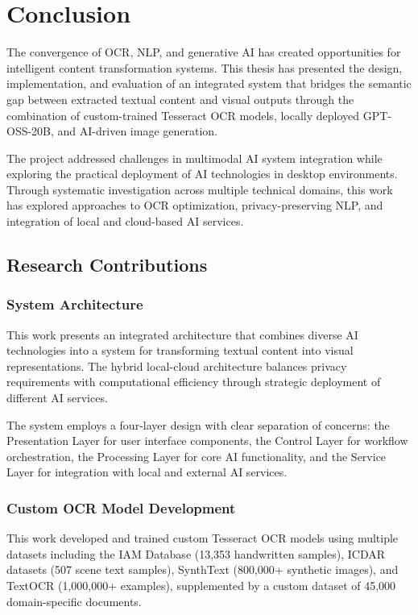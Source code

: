 \chapter{Conclusion}

The convergence of OCR, NLP, and generative AI has created opportunities for intelligent content transformation systems. This thesis has presented the design, implementation, and evaluation of an integrated system that bridges the semantic gap between extracted textual content and visual outputs through the combination of custom-trained Tesseract OCR models, locally deployed GPT-OSS-20B, and AI-driven image generation.

The project addressed challenges in multimodal AI system integration while exploring the practical deployment of AI technologies in desktop environments. Through systematic investigation across multiple technical domains, this work has explored approaches to OCR optimization, privacy-preserving NLP, and integration of local and cloud-based AI services.

\section{Research Contributions}

\subsection{System Architecture}

This work presents an integrated architecture that combines diverse AI technologies into a system for transforming textual content into visual representations. The hybrid local-cloud architecture balances privacy requirements with computational efficiency through strategic deployment of different AI services.

The system employs a four-layer design with clear separation of concerns: the Presentation Layer for user interface components, the Control Layer for workflow orchestration, the Processing Layer for core AI functionality, and the Service Layer for integration with local and external AI services.

\subsection{Custom OCR Model Development}

This work developed and trained custom Tesseract OCR models using multiple datasets including the IAM Database (13,353 handwritten samples), ICDAR datasets (507 scene text samples), SynthText (800,000+ synthetic images), and TextOCR (1,000,000+ examples), supplemented by a custom dataset of 45,000 domain-specific documents.

